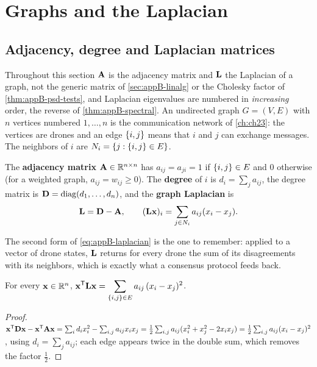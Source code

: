 \section{Graphs and the Laplacian}
\label{sec:appB-graphs}

\subsection{Adjacency, degree and Laplacian matrices}

Throughout this section $\mathbf{A}$ is the adjacency matrix and $\mathbf{L}$ the
Laplacian of a graph, not the generic matrix of \cref{sec:appB-linalg} or the
Cholesky factor of \cref{thm:appB-psd-tests}, and Laplacian eigenvalues are
numbered in \emph{increasing} order, the reverse of \cref{thm:appB-spectral}.
An undirected graph $G = (V, E)$ with $n$ vertices numbered $1, \dots, n$ is
the communication network of \cref{ch:ch23}: the vertices are drones and an
edge $\left\{ i, j \right\}$ means that $i$ and $j$ can exchange messages. The
neighbors of $i$ are $N_i = \left\{ j : \left\{ i, j \right\} \in E \right\}$.

\begin{definition}
\label{def:appB-laplacian}
The \textbf{adjacency matrix} $\mathbf{A} \in \mathbb{R}^{n \times n}$ has $a_{ij} = a_{ji} = 1$ if $\left\{ i, j \right\} \in E$ and $0$ otherwise (for a weighted graph, $a_{ij} = w_{ij} \ge 0$). The \textbf{degree} of $i$ is $d_i = \sum_j a_{ij}$, the degree matrix is $\mathbf{D} = \operatorname{diag}(d_1, \dots, d_n)$, and the \textbf{graph Laplacian} is
\begin{equation}
  \mathbf{L} = \mathbf{D} - \mathbf{A},\qquad
  (\mathbf{L}\mathbf{x})_i = \sum_{j \in N_i} a_{ij}(x_i - x_j).
  \label{eq:appB-laplacian}
\end{equation}
\end{definition}

The second form of \cref{eq:appB-laplacian} is the one to remember: applied to
a vector of drone states, $\mathbf{L}$ returns for every drone the sum of its
disagreements with its neighbors, which is exactly what a consensus
protocol feeds back.

\begin{proposition}
\label{thm:appB-laplacian-form}
For every $\mathbf{x} \in \mathbb{R}^n$, $\displaystyle \mathbf{x}^{\mathsf{T}}\mathbf{L}\mathbf{x} = \sum_{\left\{ i,j \right\} \in E} a_{ij}\,(x_i - x_j)^2$.
\end{proposition}
\begin{proof}
$\mathbf{x}^{\mathsf{T}}\mathbf{D}\mathbf{x} - \mathbf{x}^{\mathsf{T}}\mathbf{A}\mathbf{x} = \sum_i d_i x_i^2 - \sum_{i,j} a_{ij}x_i x_j = \tfrac12\sum_{i,j} a_{ij}(x_i^2 + x_j^2 - 2x_i x_j) = \tfrac12\sum_{i,j} a_{ij}(x_i - x_j)^2$, using $d_i = \sum_j a_{ij}$; each edge appears twice in the double sum, which removes the factor $\tfrac12$. \qedhere
\end{proof}

